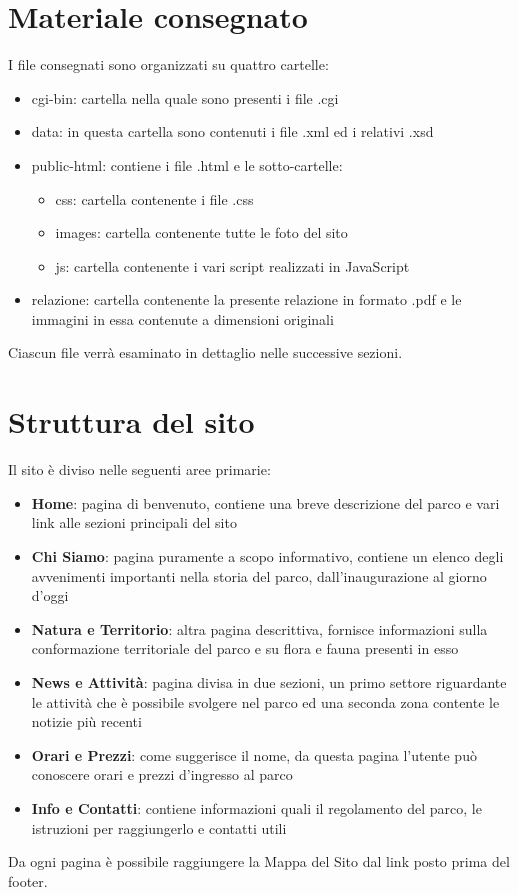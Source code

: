 \documentclass[12pt]{article}
\begin{document}
\newpage

\section{Materiale consegnato}
			
			 I file consegnati sono organizzati su quattro cartelle:
			\begin{itemize}
				\item cgi-bin: cartella nella quale sono presenti i file .cgi
				\item data: in questa cartella sono contenuti i file .xml ed i relativi .xsd
				\item public-html: contiene i file .html e le sotto-cartelle:
\begin{itemize}
\item css: cartella contenente i file .css
		\item		 images: cartella contenente tutte le foto del sito
			\item	 js: cartella contenente i vari script realizzati in JavaScript
\end{itemize}		
\item relazione: cartella contenente la presente relazione in formato .pdf e le immagini in essa contenute a dimensioni originali		 
			\end{itemize}	
			Ciascun file verr\`a esaminato in dettaglio nelle successive sezioni. 
			
			\newpage

\section{Struttura del sito}
Il sito \`e diviso nelle seguenti aree primarie: 
		\begin{itemize}
			\item \textbf{Home}: pagina di benvenuto, contiene una breve descrizione del parco e vari link alle sezioni principali del sito
			\item \textbf{Chi Siamo}: pagina puramente a scopo informativo, contiene un elenco degli avvenimenti importanti nella storia del parco, dall'inaugurazione al giorno d'oggi
			\item \textbf{Natura e Territorio}: altra pagina descrittiva, fornisce informazioni sulla conformazione territoriale del parco e su flora e fauna presenti in esso
			\item \textbf{News e Attivit\`a}: pagina divisa in due sezioni, un primo settore riguardante le attivit\`a che \`e possibile svolgere nel parco ed una seconda zona contente le notizie pi\`u recenti
			\item \textbf{Orari e Prezzi}: come suggerisce il nome, da questa pagina l'utente pu\`o conoscere orari e prezzi d'ingresso al parco
			\item \textbf{Info e Contatti}: contiene informazioni quali il regolamento del parco, le istruzioni per raggiungerlo e contatti utili
		\end{itemize}				
Da ogni pagina \`e possibile raggiungere la Mappa del Sito dal link posto prima del footer.	
\end{document}
